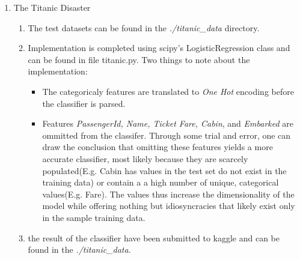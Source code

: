 \documentclass{report}
\begin{document}
\begin{enumerate}
\begin{enumerate}[label=(\alph*)]
	\end{enumerate}
	\item The Titanic Disaster
	\begin{enumerate}[label=(\alph*)]
		\item The test datasets can be found in the \textit{./titanic\_data} directory.
		\item Implementation is completed using scipy's LogisticRegression class and can be found in file titanic.py. Two things to note about the implementation:
		\begin{itemize}
		\item The categoricaly features are translated to \textit{One Hot} encoding before the classifier is parsed.
		\item Features \textit{PassengerId, Name, Ticket Fare, Cabin}, and \textit{Embarked} are ommitted from the classifer.  Through some trial and error, one can draw the conclusion that omitting these features yields a more accurate classifier, most likely because they are scarcely populated(E.g. Cabin has values in the test set do not exist in the training data) or contain a a high number of unique, categorical values(E.g. Fare). The values thus increase the dimensionality of the model while offering nothing but idiosyncracies that likely exist only in the sample training data.
		\end{itemize}
		\item the result of the classifier have been submitted to kaggle and can be found in the \textit{./titanic\_data}. 
	\end{enumerate}
	
\end{enumerate}
\end{document}
